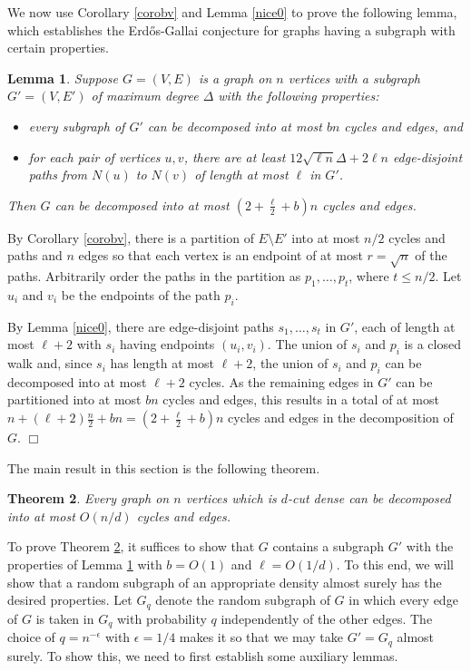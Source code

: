 \documentclass[11pt]{article}
\newtheorem{theorem}{Theorem}[section]
\newtheorem{lemma}[theorem]{Lemma}
\newenvironment{proof}
      {\medskip\noindent{\bf Proof:}\hspace{1mm}}
      {\hfill$\Box$\medskip}
\begin{document}
We now use Corollary \ref{corobv} and Lemma \ref{nice0} to prove the following lemma, which establishes the Erd\H{o}s-Gallai conjecture for graphs having a subgraph with certain properties.

\begin{lemma}\label{nicestep1}
Suppose $G=(V,E)$ is a graph on $n$ vertices with a subgraph $G'=(V,E')$ of maximum degree $\Delta$ with the following properties:
\begin{itemize}
\item every subgraph of $G'$ can be decomposed into at most $bn$ cycles and edges, and
\item for each pair of vertices $u, v$, there are at least $12\sqrt{\ell n}\Delta+2\ell n$ edge-disjoint paths from $N(u)$ to $N(v)$ of length at most $\ell$ in $G'$.
\end{itemize}
Then $G$ can be decomposed into at most $(2+\frac{\ell}{2}+b)n$ cycles and edges.
\end{lemma}
\begin{proof}
By Corollary \ref{corobv}, there is a partition of $E\setminus E'$ into at most $n/2$ cycles and paths
and $n$ edges so that each vertex is an endpoint of at most $r=\sqrt{n}$ of the paths. Arbitrarily order the paths in the partition as $p_1,\ldots,p_t$, where $t \leq n/2$. Let $u_i$ and $v_i$ be the endpoints of the path $p_i$.

By Lemma \ref{nice0}, there are edge-disjoint paths $s_1,\ldots,s_t$ in $G'$, each of length at most $\ell + 2$ with $s_i$ having endpoints $(u_i,v_i)$. The union of $s_i$ and $p_i$ is a closed walk and, since $s_i$ has length at most
$\ell + 2$, the union of $s_i$ and $p_i$ can be decomposed into at most $\ell + 2$ cycles. As the remaining edges in $G'$ can be partitioned into at most $bn$ cycles and edges, this results in a total of at most $n+(\ell + 2)\frac{n}{2}+bn=(2+\frac{\ell}{2}+b)n$ cycles and edges in the decomposition of $G$.
\end{proof}

The main result in this section is the following theorem.

\begin{theorem} \label{thmcutdense}
Every graph on $n$ vertices which is $d$-cut dense can be decomposed into at most $O(n/d)$ cycles and edges.
\end{theorem}

To prove Theorem \ref{thmcutdense}, it suffices to show that $G$ contains a subgraph $G'$ with the properties of Lemma \ref{nicestep1} with $b=O(1)$ and $\ell=O(1/d)$. To this end, we will show that
a random subgraph of an appropriate density almost surely has the desired properties. Let $G_q$ denote the random subgraph of $G$ in which every edge of $G$ is taken in $G_q$ with probability $q$ independently of the other edges. The choice of $q=n^{-\epsilon}$ with $\epsilon=1/4$ makes it so that we may take $G'=G_q$ almost surely. To show this, we need to first establish some auxiliary lemmas.
\end{document}
